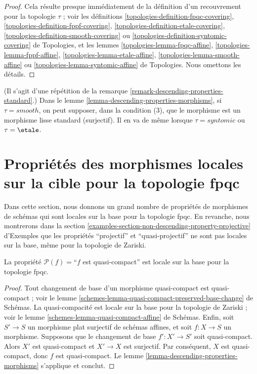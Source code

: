 \begin{proof}
Cela résulte presque immédiatement de la définition d'un recouvrement pour
la topologie $\tau$ ; voir les définitions
\ref{topologies-definition-fpqc-covering},
\ref{topologies-definition-fppf-covering},
\ref{topologies-definition-etale-covering},
\ref{topologies-definition-smooth-covering} ou
\ref{topologies-definition-syntomic-covering} de Topologies, et les lemmes
\ref{topologies-lemma-fpqc-affine},
\ref{topologies-lemma-fppf-affine},
\ref{topologies-lemma-etale-affine},
\ref{topologies-lemma-smooth-affine} ou
\ref{topologies-lemma-syntomic-affine} de Topologies. Nous omettons les détails.
\end{proof}

\begin{remark}
\label{remark-descending-properties-morphisms-standard}
(Il s'agit d'une répétition de la remarque
\ref{remark-descending-properties-standard}.) Dans le
lemme \ref{lemma-descending-properties-morphisms}, si $\tau = smooth$, on
peut supposer, dans la condition (3), que le morphisme est un morphisme lisse
standard (surjectif). Il en va de même lorsque $\tau = syntomic$ ou
$\tau = \etale$.
\end{remark}




\section[Localité sur la cible (fpqc)]{Propriétés des morphismes locales sur la cible pour la topologie fpqc}
\label{section-descending-properties-morphisms-fpqc}

\noindent
Dans cette section, nous donnons un grand nombre de propriétés de morphismes
de schémas qui sont locales sur la base pour la topologie fpqc. En revanche,
nous montrerons dans la section
\ref{examples-section-non-descending-property-projective} d'Exemples que les propriétés
``projectif'' et ``quasi-projectif'' ne sont pas locales sur la base, même
pour la topologie de Zariski.

\begin{lemma}
\label{lemma-descending-property-quasi-compact}
La propriété $\mathcal{P}(f) =$``$f$ est quasi-compact'' est locale sur la
base pour la topologie fpqc.
\end{lemma}

\begin{proof}
Tout changement de base d'un morphisme quasi-compact est quasi-compact ; voir
le lemme \ref{schemes-lemma-quasi-compact-preserved-base-change} de Schémas.
La quasi-compacité est locale sur la base pour la topologie de Zariski ; voir
le lemme \ref{schemes-lemma-quasi-compact-affine} de Schémas. Enfin, soit
$S' \to S$ un morphisme plat surjectif de schémas affines, et soit
$f : X \to S$ un morphisme. Supposons que le changement de base
$f' : X' \to S'$ soit quasi-compact. Alors $X'$ est quasi-compact et
$X' \to X$ est surjectif. Par conséquent, $X$ est quasi-compact, donc $f$
est quasi-compact. Le lemme \ref{lemma-descending-properties-morphisms}
s'applique et conclut.
\end{proof}

